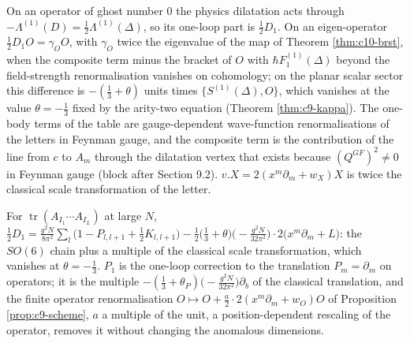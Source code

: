 \begin{remark}
On an operator of ghost number $0$ the physics dilatation acts through $-\Lambda^{(1)}(D)=\tfrac12\Lambda^{(1)}(\Delta)$, so its one-loop part is $\tfrac12D_1$. On an eigen-operator $\tfrac12D_1O=\gamma_OO$, with $\gamma_O$ twice the eigenvalue of the map of Theorem \ref{thm:c10-brst}, when the composite term minus the bracket of $O$ with $\hbar F_1^{(1)}(\Delta)$ beyond the field-strength renormalisation vanishes on cohomology; on the planar scalar sector this difference is $-(\tfrac13+\theta)$ units times $\{S^{(1)}(\Delta),O\}$, which vanishes at the value $\theta=-\tfrac13$ fixed by the arity-two equation (Theorem \ref{thm:c9-kappa}). The one-body terms of the table are gauge-dependent wave-function renormalisations of the letters in Feynman gauge, and the composite term is the contribution of the line from $c$ to $A_m$ through the dilatation vertex that exists because $(Q^{GF})^2\neq0$ in Feynman gauge (block after Section 9.2). $v.X=2(x^m\partial_m+w_X)X$ is twice the classical scale transformation of the letter.
\end{remark}

\begin{remark}
For $\operatorname{tr}(A_{I_1}\cdots A_{I_L})$ at large $N$, $\tfrac12D_1=\frac{g^2N}{8\pi^2}\sum_l\big(1-P_{l,l+1}+\tfrac12K_{l,l+1}\big)-\tfrac12\big(\tfrac13+\theta\big)\big(-\frac{g^2N}{32\pi^2}\big)\cdot2\big(x^m\partial_m+L\big)$: the $SO(6)$ chain plus a multiple of the classical scale transformation, which vanishes at $\theta=-\tfrac13$. $P_1$ is the one-loop correction to the translation $P_m=\partial_m$ on operators; it is the multiple $-(\tfrac13+\theta_P)\big(-\frac{g^2N}{32\pi^2}\big)\partial_b$ of the classical translation, and the finite operator renormalisation $O\mapsto O+\tfrac a2\cdot2(x^m\partial_m+w_O)O$ of Proposition \ref{prop:c9-scheme}, $a$ a multiple of the unit, a position-dependent rescaling of the operator, removes it without changing the anomalous dimensions.
\end{remark}

